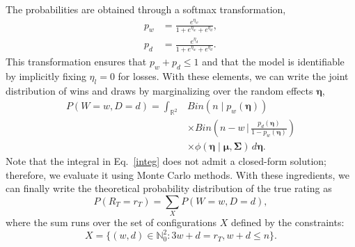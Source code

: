 \documentclass[preprint,12pt]{elsarticle}
\begin{document}
%
The probabilities are obtained through a softmax transformation,
%
\begin{equation}
\begin{aligned}
p_w &= \frac{e^{\eta_w}}{1 + e^{\eta_w} + e^{\eta_d}},\\
%
p_d &= \frac{e^{\eta_d}}{1 + e^{\eta_w} + e^{\eta_d}}.
\end{aligned}
\end{equation}
%
This transformation ensures that $p_w + p_d \leq 1$ and that the model is identifiable by implicitly fixing $\eta_l = 0$ for losses.
%
With these elements, we can write the joint distribution of wins and draws by marginalizing over the random effects $\boldsymbol{\eta}$,
%
\begin{equation} \label{integ}
\begin{split}
P( W=w, D=d ) = \int_{\mathbb{R}^2} & Bin( n \mid p_w(\boldsymbol{\eta}) ) \\
& \times Bin\!\left( n-w \,\bigg|\, \frac{p_d(\boldsymbol{\eta})}{1-p_w(\boldsymbol{\eta})} \right) \\
& \times \phi( \boldsymbol{\eta} \mid \boldsymbol{\mu}, \boldsymbol{\Sigma} ) \, d \boldsymbol{\eta}.
\end{split}
\end{equation}
%
Note that the integral in Eq.~\ref{integ} does not admit a closed-form solution; therefore, we evaluate it using Monte Carlo methods.
%
With these ingredients, we can finally write the theoretical probability distribution of the true rating as
%
\begin{equation} \label{theo}
P(R_T = r_T) = \sum_X P( W=w, D=d ),
\end{equation}
%
where the sum runs over the set of configurations $X$ defined by the constraints:
%
\begin{equation}
X = \{ (w, d) \in \mathbb{N}_0^2 : 3w + d = r_T, w + d \le n \}.
\end{equation}
\end{document}
